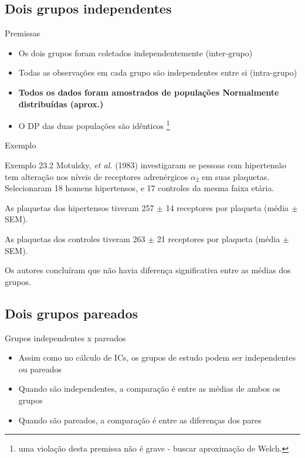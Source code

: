 \documentclass{beamer}
\begin{document}
\subsection{Dois grupos independentes}

\begin{frame}{Premissas}
  \begin{itemize}
  \item Os dois grupos foram coletados independentemente (inter-grupo)
  \item Todas as observações em cada grupo são independentes entre si (intra-grupo)
  \item {\bf Todos os dados foram amostrados de populações Normalmente distribuídas (aprox.)}
  \item O DP das duas populações são idênticos \footnote{uma violação desta premissa não é grave - buscar aproximação de Welch.}
  \end{itemize}
\end{frame}

\begin{frame}{Exemplo}
  \begin{exampleblock}{Exemplo 23.2}
    Motulsky, {\em et al.} (1983) investigaram se pessoas com hipertensão tem alteração nos níveis de receptores adrenérgicos $\alpha_2$ em suas plaquetas.
    Selecionaram 18 homens hipertensos, e 17 controles da mesma faixa etária.

    As plaquetas dos hipertensos tiveram 257 $\pm$ 14 receptores por plaqueta (média $\pm$ SEM).

    As plaquetas dos controles tiveram 263 $\pm$ 21 receptores por plaqueta (média $\pm$ SEM).

    \bigskip
    Os autores concluíram que não havia diferença significativa entre as médias dos grupos.
  \end{exampleblock}
\end{frame}

\subsection{Dois grupos pareados}

\begin{frame}{Grupos independentes x pareados}
  \begin{itemize}
  \item Assim como no cálculo de ICs, os grupos de estudo podem ser independentes ou pareados
  \item Quando são independentes, a comparação é entre as médias de ambos os grupos
  \item Quando são pareados, a comparação é entre as diferenças dos pares
  \end{itemize}
\end{frame}
\end{document}
